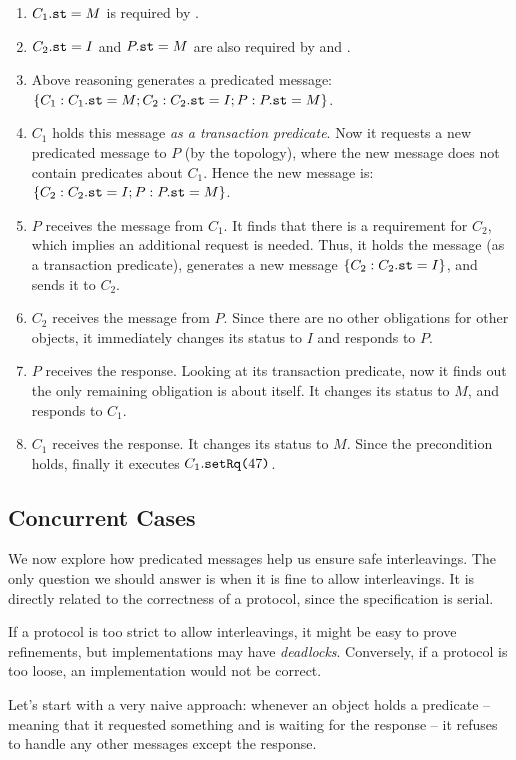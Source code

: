 \documentclass[format=manuscript]{acmart}
\begin{document}
\begin{enumerate}
\item $C_1.\texttt{st} = M$ is required by .
\item $C_2.\texttt{st} = I$ and $P.\texttt{st} = M$ are also required by  and
  .
\item Above reasoning generates a predicated message: $\{ C_1: C_1.\texttt{st} = M;
  C_2: C_2.\texttt{st} = I; P: P.\texttt{st} = M \}$.
\item $C_1$ holds this message \emph{as a transaction predicate}. Now it
  requests a new predicated message to $P$ (by the topology), where the new
  message does not contain predicates about $C_1$. Hence the new message is: $\{
  C_2: C_2.\texttt{st} = I; P: P.\texttt{st} = M \}$.
\item $P$ receives the message from $C_1$. It finds that there is a requirement
  for $C_2$, which implies an additional request is needed. Thus, it holds the
  message (as a transaction predicate), generates a new message $\{ C_2:
  C_2.\texttt{st} = I \}$, and sends it to $C_2$.
\item $C_2$ receives the message from $P$. Since there are no other obligations
  for other objects, it immediately changes its status to $I$ and responds to
  $P$.
\item $P$ receives the response. Looking at its transaction predicate, now it
  finds out the only remaining obligation is about itself. It changes its status
  to $M$, and responds to $C_1$.
\item $C_1$ receives the response. It changes its status to $M$. Since the
  precondition holds, finally it executes $C_1.\texttt{setRq(}47\texttt{)}$.
\end{enumerate}

\subsection{Concurrent Cases}\label{concurrent-cases}

We now explore how predicated messages help us ensure safe interleavings. The
only question we should answer is when it is fine to allow interleavings. It is
directly related to the correctness of a protocol, since the specification is
serial.

If a protocol is too strict to allow interleavings, it might be easy to prove
refinements, but implementations may have \emph{deadlocks}. Conversely, if a
protocol is too loose, an implementation would not be correct.

Let's start with a very naive approach: whenever an object holds a predicate --
meaning that it requested something and is waiting for the response -- it
refuses to handle any other messages except the response.
\end{document}
